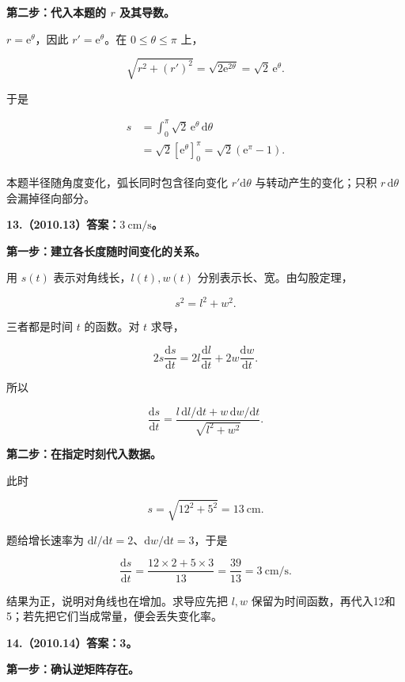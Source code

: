 \documentclass[UTF8,11pt,fontset=windows]{ctexart}
\begin{document}
\textbf{第二步：代入本题的 $r$ 及其导数。}

$r=\mathrm e^\theta$，因此 $r'=\mathrm e^\theta$。在 $0\le\theta\le\pi$ 上，

$$
\sqrt{r^2+(r')^2}
=\sqrt{2\mathrm e^{2\theta}}=\sqrt2\,\mathrm e^\theta.
$$

于是

$$
\begin{aligned}
s&=\int_0^\pi\sqrt2\,\mathrm e^\theta\,\mathrm d\theta\\
&=\sqrt2[\mathrm e^\theta]_0^\pi
=\boxed{\sqrt2(\mathrm e^\pi-1)}.
\end{aligned}
$$

本题半径随角度变化，弧长同时包含径向变化 $r'\mathrm d\theta$ 与转动产生的变化；只积 $r\,\mathrm d\theta$ 会漏掉径向部分。

\clearpage

\textbf{13.（2010.13）答案：$3\ \mathrm{cm/s}$。}

\textbf{第一步：建立各长度随时间变化的关系。}

用 $s(t)$ 表示对角线长，$l(t),w(t)$ 分别表示长、宽。由勾股定理，

$$
s^2=l^2+w^2.
$$

三者都是时间 $t$ 的函数。对 $t$ 求导，

$$
2s\frac{\mathrm ds}{\mathrm dt}
=2l\frac{\mathrm dl}{\mathrm dt}
+2w\frac{\mathrm dw}{\mathrm dt}.
$$

所以

$$
\frac{\mathrm ds}{\mathrm dt}
=\frac{l\,\mathrm dl/\mathrm dt+w\,\mathrm dw/\mathrm dt}{\sqrt{l^2+w^2}}.
$$

\textbf{第二步：在指定时刻代入数据。}

此时

$$
s=\sqrt{12^2+5^2}=13\ \mathrm{cm}.
$$

题给增长速率为 $\mathrm dl/\mathrm dt=2$、$\mathrm dw/\mathrm dt=3$，于是

$$
\frac{\mathrm ds}{\mathrm dt}
=\frac{12\times2+5\times3}{13}
=\frac{39}{13}
=\boxed{3\ \mathrm{cm/s}}.
$$

结果为正，说明对角线也在增加。求导应先把 $l,w$ 保留为时间函数，再代入12和5；若先把它们当成常量，便会丢失变化率。

\clearpage

\textbf{14.（2010.14）答案：3。}

\textbf{第一步：确认逆矩阵存在。}
\end{document}
